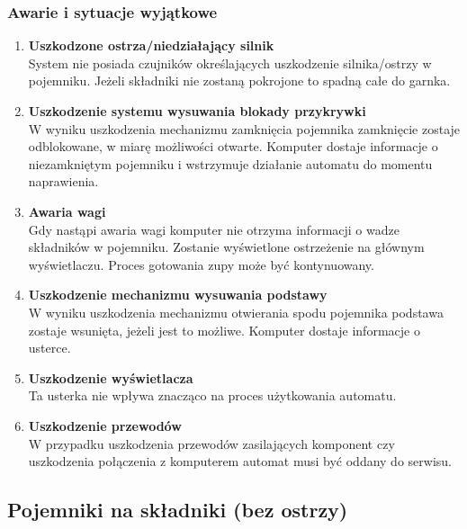 \documentclass[12pt,a4paper,notitlepage]{article}
\begin{document}
\subsubsection{Awarie i sytuacje wyjątkowe}
\begin{enumerate}
  \item \textbf{Uszkodzone ostrza/niedziałający silnik}\\
System nie posiada czujników określających uszkodzenie silnika/ostrzy w pojemniku. Jeżeli składniki nie zostaną pokrojone to spadną całe do garnka.
  \item \textbf{Uszkodzenie systemu wysuwania blokady przykrywki}\\
W wyniku uszkodzenia mechanizmu zamknięcia pojemnika zamknięcie zostaje odblokowane, w miarę możliwości otwarte. Komputer dostaje informacje o niezamkniętym pojemniku i wstrzymuje działanie automatu do momentu naprawienia.
  \item \textbf{Awaria wagi}\\
Gdy nastąpi awaria wagi komputer nie otrzyma informacji o wadze składników w pojemniku. Zostanie wyświetlone ostrzeżenie na głównym wyświetlaczu. Proces gotowania zupy może być kontynuowany.
  \item \textbf{Uszkodzenie mechanizmu wysuwania podstawy}\\
W wyniku uszkodzenia mechanizmu otwierania spodu pojemnika podstawa zostaje wsunięta, jeżeli jest to możliwe. Komputer dostaje informacje o usterce.
  \item \textbf{Uszkodzenie wyświetlacza}\\
Ta usterka nie wpływa znacząco na proces użytkowania automatu.
  \item \textbf{Uszkodzenie przewodów}\\
W przypadku uszkodzenia przewodów zasilających komponent czy uszkodzenia połączenia z komputerem automat musi być oddany do serwisu.
\end{enumerate}


\subsection{Pojemniki na składniki (bez ostrzy)}
\end{document}
